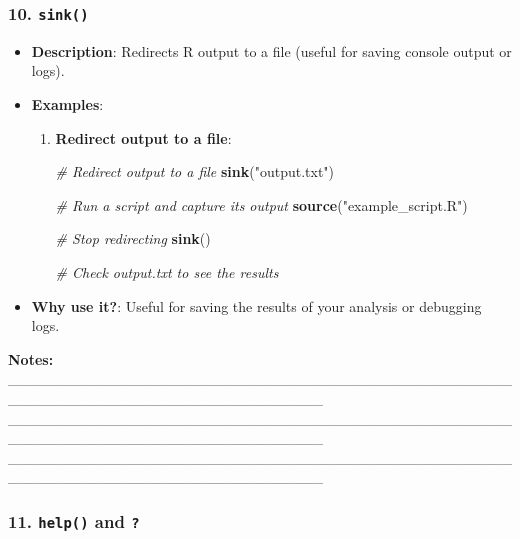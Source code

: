 \documentclass[
  11pt,
]{article}
\newenvironment{Shaded}{\begin{snugshade}}{\end{snugshade}}
\newcommand{\CommentTok}[1]{\textcolor[rgb]{0.56,0.35,0.01}{\textit{#1}}}
\newcommand{\FunctionTok}[1]{\textcolor[rgb]{0.13,0.29,0.53}{\textbf{#1}}}
\newcommand{\NormalTok}[1]{#1}
\newcommand{\StringTok}[1]{\textcolor[rgb]{0.31,0.60,0.02}{#1}}
\providecommand{\tightlist}{%
  \setlength{\itemsep}{0pt}\setlength{\parskip}{0pt}}
\begin{document}
\subsubsection{\texorpdfstring{10.
\texttt{sink()}}{10. sink()}}\label{sink}

\begin{itemize}
\tightlist
\item
  \textbf{Description}: Redirects R output to a file (useful for saving
  console output or logs).
\item
  \textbf{Examples}:

  \begin{enumerate}
  \def\labelenumi{\arabic{enumi}.}
  \item
    \textbf{Redirect output to a file}:

\begin{Shaded}
\begin{Highlighting}[]
 \CommentTok{\# Redirect output to a file}
 \FunctionTok{sink}\NormalTok{(}\StringTok{"output.txt"}\NormalTok{)}

 \CommentTok{\# Run a script and capture its output}
 \FunctionTok{source}\NormalTok{(}\StringTok{"example\_script.R"}\NormalTok{)}

 \CommentTok{\# Stop redirecting}
 \FunctionTok{sink}\NormalTok{()}

 \CommentTok{\# Check output.txt to see the results}
\end{Highlighting}
\end{Shaded}
  \end{enumerate}
\item
  \textbf{Why use it?}: Useful for saving the results of your analysis
  or debugging logs.
\end{itemize}

\textbf{Notes:}
\_\_\_\_\_\_\_\_\_\_\_\_\_\_\_\_\_\_\_\_\_\_\_\_\_\_\_\_\_\_\_\_\_\_\_\_\_\_\_\_\_\_\_\_\_\_\_\_\_\_\_\_\_\_\_\_\_\_\_\_\_\_\_\_\_\_\_\_\_\_\_\_\_\_\_\_\_\_
\_\_\_\_\_\_\_\_\_\_\_\_\_\_\_\_\_\_\_\_\_\_\_\_\_\_\_\_\_\_\_\_\_\_\_\_\_\_\_\_\_\_\_\_\_\_\_\_\_\_\_\_\_\_\_\_\_\_\_\_\_\_\_\_\_\_\_\_\_\_\_\_\_\_\_\_\_\_
\_\_\_\_\_\_\_\_\_\_\_\_\_\_\_\_\_\_\_\_\_\_\_\_\_\_\_\_\_\_\_\_\_\_\_\_\_\_\_\_\_\_\_\_\_\_\_\_\_\_\_\_\_\_\_\_\_\_\_\_\_\_\_\_\_\_\_\_\_\_\_\_\_\_\_\_\_\_

\subsubsection{\texorpdfstring{11. \texttt{help()} and
\texttt{?}}{11. help() and ?}}\label{help-and}
\end{document}
